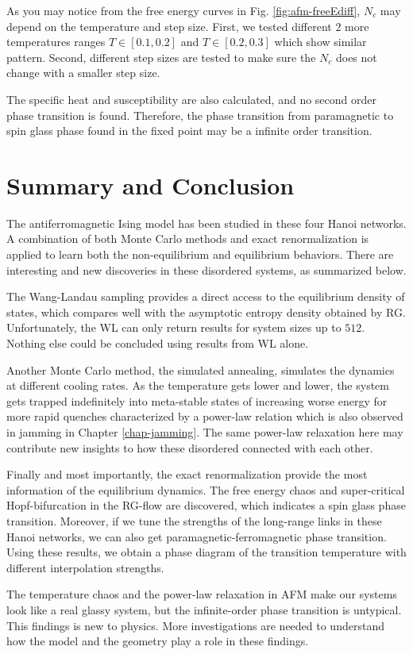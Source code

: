 As you may notice from the free energy curves in Fig. \ref{fig:afm-freeEdiff}, $N_c$ may depend on the temperature and step size. First, we tested different 2 more temperatures ranges $T \in [0.1, 0.2]$ and $T \in [0.2, 0.3]$ which show similar pattern. Second, different step sizes are tested to make sure the $N_c$ does not change with a smaller step size. 

The specific heat and susceptibility are also calculated, and no second order phase transition is found. Therefore, the phase transition from paramagnetic to spin glass phase found in the fixed point may be a infinite order transition. 


\section{Summary and Conclusion}
The antiferromagnetic Ising model has been studied in these four Hanoi networks. A combination of both Monte Carlo methods and exact renormalization is applied to learn both the non-equilibrium and equilibrium behaviors. There are interesting and new discoveries in these disordered systems, as summarized below.

The Wang-Landau sampling provides a direct access to the equilibrium density of states, which compares well with the asymptotic entropy density obtained by RG. Unfortunately, the WL can only return results for system sizes up to $512$. Nothing else could be concluded using results from WL alone. 

Another Monte Carlo method, the simulated annealing, simulates the dynamics at different cooling rates. As the temperature gets lower and lower, the system gets trapped indefinitely into meta-stable states of increasing worse energy for more rapid quenches characterized by a power-law relation \cite{cheng2015jamming} which is also observed in jamming in Chapter \ref{chap-jamming}. The same power-law relaxation here may contribute new insights to how these disordered connected with each other.

Finally and most importantly, the exact renormalization provide the most information of the equilibrium dynamics. The free energy chaos and super-critical Hopf-bifurcation in the RG-flow are discovered, which indicates a spin glass phase transition. Moreover, if we tune the strengths of the long-range links in these Hanoi networks, we can also get paramagnetic-ferromagnetic phase transition. Using these results, we obtain a phase diagram of the transition temperature with different interpolation strengths.

The temperature chaos and the power-law relaxation in AFM make our systems look like a real glassy system, but the infinite-order phase transition is untypical. This findings is new to physics. More investigations are needed to understand how the model and the geometry play a role in these findings. 









